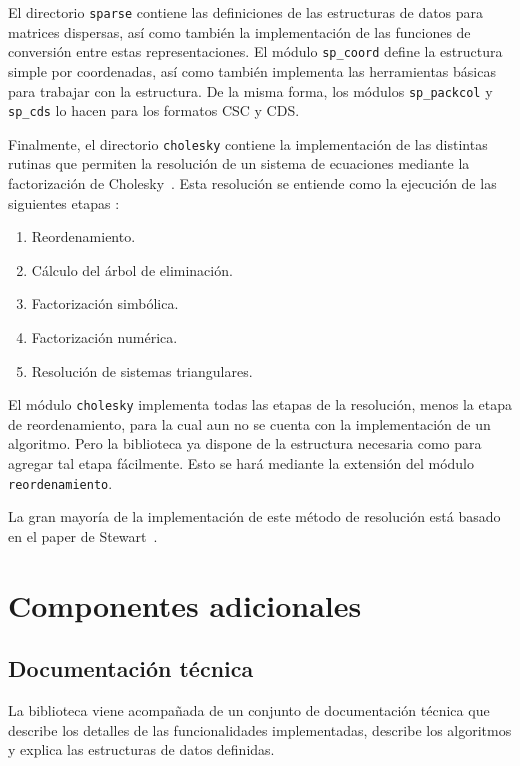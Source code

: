\documentclass{cacic06}
\begin{document}
El directorio \texttt{sparse} contiene las definiciones de las estructuras de datos para matrices dispersas, así como también la implementación de las funciones de conversión entre estas representaciones.
El módulo \texttt{sp\_coord} define la estructura simple por coordenadas, así como también implementa las herramientas básicas para trabajar con la estructura. De la misma forma, los módulos \texttt{sp\_packcol} y \texttt{sp\_cds} lo hacen para los formatos CSC y CDS.

Finalmente, el directorio \texttt{cholesky} contiene la implementación de las distintas rutinas que permiten la resolución de un sistema de ecuaciones mediante la factorización de Cholesky~\cite{duff}. Esta resolución se entiende como la ejecución de las siguientes etapas \cite{george}:
\begin{enumerate}
 \item Reordenamiento.
 \item Cálculo del árbol de eliminación.
 \item Factorización simbólica.
 \item Factorización numérica.
 \item Resolución de sistemas triangulares.
\end{enumerate}

El módulo \texttt{cholesky} implementa todas las etapas de la resolución, menos la etapa de reordenamiento, para la cual aun no se cuenta con la implementación de un algoritmo. Pero la biblioteca ya dispone de la estructura necesaria como para agregar tal etapa fácilmente. Esto se hará mediante la extensión del módulo \texttt{reordenamiento}.

La gran mayoría de la implementación de este método de resolución está basado en el paper de Stewart~\cite{stewart}. 


\section{Componentes adicionales}
\label{sec_componentes}
\subsection{Documentación técnica}
La biblioteca viene acompañada de un conjunto de documentación técnica que describe los detalles de las funcionalidades implementadas, describe los algoritmos y explica las estructuras de datos definidas.
\end{document}
